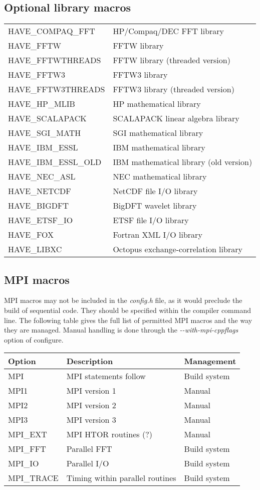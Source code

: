 \subsection{Optional library macros}

\begin{center}
\begin{tabular}{ll}
HAVE\_COMPAQ\_FFT  & HP/Compaq/DEC FFT library \tabularnewline
HAVE\_FFTW  & FFTW library \tabularnewline
HAVE\_FFTWTHREADS  & FFTW library (threaded version) \tabularnewline
HAVE\_FFTW3  & FFTW3 library \tabularnewline
HAVE\_FFTW3THREADS  & FFTW3 library (threaded version) \tabularnewline
\hline 
HAVE\_HP\_MLIB  & HP mathematical library \tabularnewline
HAVE\_SCALAPACK  & SCALAPACK linear algebra library \tabularnewline
HAVE\_SGI\_MATH  & SGI mathematical library \tabularnewline
HAVE\_IBM\_ESSL  & IBM mathematical library \tabularnewline
HAVE\_IBM\_ESSL\_OLD  & IBM mathematical library (old version) \tabularnewline
HAVE\_NEC\_ASL  & NEC mathematical library \tabularnewline
\hline 
HAVE\_NETCDF  & NetCDF file I/O library \tabularnewline
\hline 
HAVE\_BIGDFT  & BigDFT wavelet library \tabularnewline
HAVE\_ETSF\_IO  & ETSF file I/O library \tabularnewline
HAVE\_FOX  & Fortran XML I/O library \tabularnewline
HAVE\_LIBXC  & Octopus exchange-correlation library \tabularnewline
\end{tabular}
\par\end{center}


\subsection{MPI macros}

MPI macros may not be included in the \textit{config.h} file, as it
would preclude the build of sequential code. They should be specified
within the compiler command line. The following table gives the full
list of permitted MPI macros and the way they are managed. Manual
handling is done through the \textit{-{-}with-mpi-cppflags} option
of configure.

\begin{center}
\begin{tabular}{|l|l|l|}
\hline 
\textbf{Option}  & \textbf{Description}  & \textbf{Management} \tabularnewline
\hline 
MPI  & MPI statements follow  & Build system \tabularnewline
\hline 
MPI1  & MPI version 1  & Manual \tabularnewline
MPI2  & MPI version 2  & Manual \tabularnewline
MPI3  & MPI version 3  & Manual \tabularnewline
\hline 
MPI\_EXT  & MPI HTOR routines (?)  & Manual \tabularnewline
MPI\_FFT  & Parallel FFT  & Build system \tabularnewline
MPI\_IO  & Parallel I/O  & Build system \tabularnewline
MPI\_TRACE  & Timing within parallel routines  & Build system \tabularnewline
\hline
\end{tabular}
\par\end{center}


